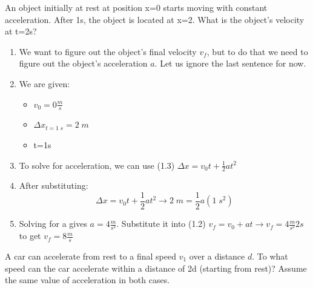 
\begin{question}
An object initially at rest at position x=0 starts moving with constant acceleration. After 1s, the object is located at x=2. What is the object's velocity at t=2s?
\end{question}

\begin{solution}
\begin{enumerate}
    \item We want to figure out the object's final velocity $v_f$, but to do that we need to figure out the object's acceleration $a$. Let us ignore the last sentence for now.
    \item We are given:
    \begin{itemize}
        \item $v_0 = 0\frac{m}{s}$
        \item $\Delta x_{t=1\;s} = 2\;m$
        \item t=1\;s
    \end{itemize}
    \item To solve for acceleration, we can use (1.3) $\Delta x = v_0t + \frac{1}{2}at^2$
    \item After substituting:
    \begin{equation*}
        \Delta x = v_0t + \frac{1}{2}at^2 \rightarrow
        2\;m = \frac{1}{2}a(1\;s^2)
    \end{equation*}
    \item Solving for a gives $a = 4\frac{m}{s^2}$. Substitute it into (1.2) $v_f=v_0+at \rightarrow v_f=4\frac{m}{s^2}2s$ to get $v_f=8\frac{m}{s}$
\end{enumerate}
\end{solution}


\begin{question}
A car can accelerate from rest to a final speed $v_1$ over a distance $d$. To what speed can the car accelerate within a distance of 2d (starting from rest)? Assume the same value of acceleration in both cases.
\end{question}

